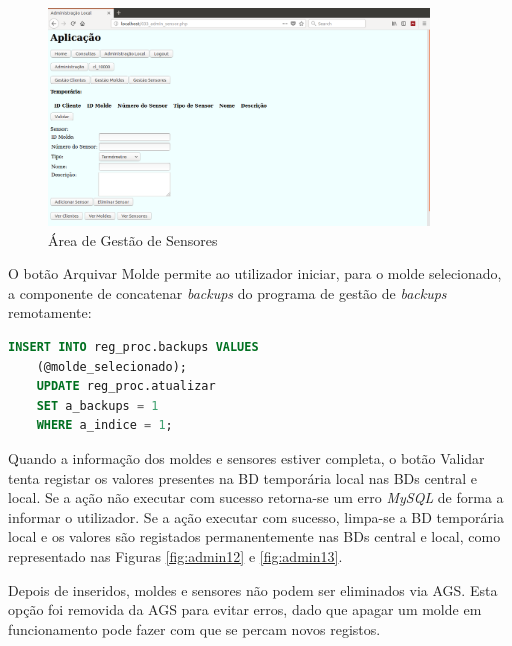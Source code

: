 \documentclass[11pt,twoside,a4paper]{report}
\begin{document}
\begin{figure}[H]
	\centering
		\includegraphics[width=0.9\textwidth]{administracao06} %
		\caption{Área de Gestão de Sensores}
		\label{fig:admin10}
\end{figure}
O botão Arquivar Molde permite ao utilizador iniciar, para o molde selecionado, a componente de concatenar \textit{backups} do programa de gestão de \textit{backups} remotamente:
\begin{lstlisting}[language = SQL]
	INSERT INTO reg_proc.backups VALUES
	(@molde_selecionado);
	UPDATE reg_proc.atualizar
	SET a_backups = 1
	WHERE a_indice = 1;
\end{lstlisting} 
Quando a informação dos moldes e sensores estiver completa, o botão Validar tenta registar os valores presentes na BD temporária local nas BDs central e local. Se a ação não executar com sucesso retorna-se um erro \textit{MySQL} de forma a informar o utilizador. Se a ação executar com sucesso, limpa-se a BD temporária local e os valores são registados permanentemente nas BDs central e local, como representado nas Figuras \ref{fig:admin12} e \ref{fig:admin13}.\par
Depois de inseridos, moldes e sensores não podem ser eliminados via AGS. Esta opção foi removida da AGS para evitar erros, dado que apagar um molde em funcionamento pode fazer com que se percam novos registos.\par 
\end{document}
